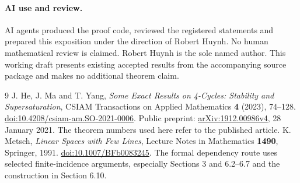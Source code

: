 \documentclass[11pt]{article}
\theoremstyle{remark}\newtheorem*{remark}{Remark}
\begin{document}
\paragraph{AI use and review.}
AI agents produced the proof code, reviewed the registered statements and prepared this exposition under the direction of Robert Huynh. No human mathematical review is claimed. Robert Huynh is the sole named author. This working draft presents existing accepted results from the accompanying source package and makes no additional theorem claim.

\begin{thebibliography}{9}
 J. He, J. Ma and T. Yang, \emph{Some Exact Results on 4-Cycles: Stability and Supersaturation}, CSIAM Transactions on Applied Mathematics \textbf{4} (2023), 74--128. \href{https://doi.org/10.4208/csiam-am.SO-2021-0006}{doi:10.4208/csiam-am.SO-2021-0006}. Public preprint: \href{https://arxiv.org/abs/1912.00986v4}{arXiv:1912.00986v4}, 28 January 2021. The theorem numbers used here refer to the published article.
 K. Metsch, \emph{Linear Spaces with Few Lines}, Lecture Notes in Mathematics \textbf{1490}, Springer, 1991. \href{https://doi.org/10.1007/BFb0083245}{doi:10.1007/BFb0083245}. The formal dependency route uses selected finite-incidence arguments, especially Sections 3 and 6.2--6.7 and the construction in Section 6.10.
\end{thebibliography}
\end{document}
